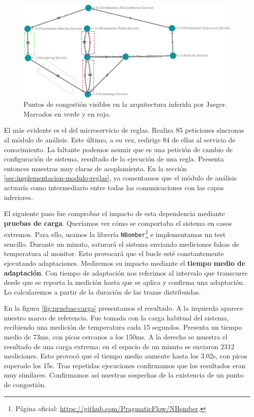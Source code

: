 \begin{figure}[htb]
  \hspace{1.25cm}
  \includegraphics[scale=0.3]{cap_despliegue/images/Pruebas-congestion}
  \caption{Puntos de congestión visibles en la arquitectura inferida por Jaeger. Marcados en verde y en rojo.}
  \label{fig:pruebas-congestion}
\end{figure}

El más evidente es el del microservicio de reglas. Realiza 85 peticiones síncronas al módulo de análisis. Este último, a su vez, redirige 84 de ellas al servicio de conocimiento. La faltante podemos asumir que es una petición de cambio de configuración de sistema, resultado de la ejecución de una regla. Presenta entonces muestras muy claras de acoplamiento. En la sección \ref{sec:implementacion-modulo-reglas}, ya comentamos que el módulo de análisis actuaría como intermediario entre todas las comunicaciones con las capas inferiores.

\pagebreak

El siguiente paso fue comprobar el impacto de esta dependencia mediante \textbf{pruebas de carga}. Queríamos ver cómo se comportaba el sistema en casos extremos. Para ello, usamos la librería \texttt{NBomber}\footnote{Página oficial: \url{https://github.com/PragmaticFlow/NBomber}.} e implementamos un test sencillo. Durante un minuto, saturará el sistema enviando mediciones falsas de temperatura al monitor. Esto provocará que el bucle esté constantemente ejecutando adaptaciones. Mediremos su impacto mediante el \textbf{tiempo medio de adaptación}. Con tiempo de adaptación nos referimos al intervalo que transcurre desde que se reporta la medición hasta que se aplica y confirma una adaptación. Lo calcularemos a partir de la duración de las trazas distribuidas.

En la figura \ref{fig:pruebas-carga} presentamos el resultado. A la izquierda aparece nuestro marco de referencia. Fue tomada con la carga habitual del sistema, recibiendo una medición de temperatura cada 15 segundos. Presenta un tiempo medio de 73ms, con picos cercanos a los 150ms. A la derecha se muestra el resultado de una carga extrema: en el espacio de un minuto se enviaron 2312 mediciones. Esto provocó que el tiempo medio aumente hasta los 3.02s, con picos superado los 15s. Tras repetidas ejecuciones confirmamos que los resultados eran muy similares. Confirmamos así nuestras sospechas de la existencia de un punto de congestión.

